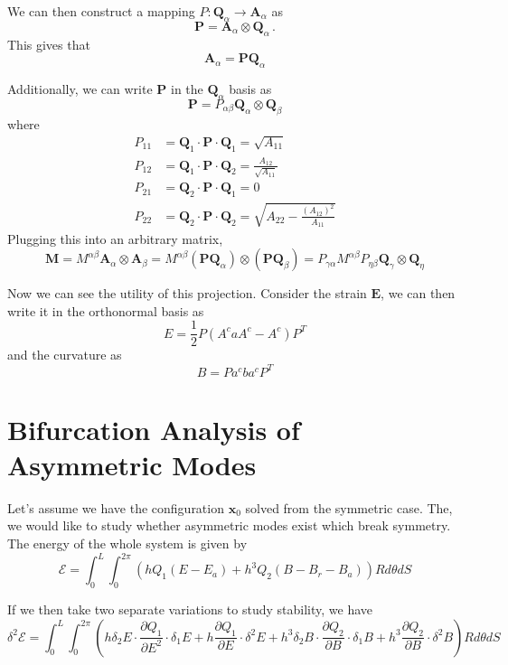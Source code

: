 \documentclass[11pt]{article}
\theoremstyle{plain}
\theoremstyle{definition}
\begin{document}
We can then construct a mapping $P : \mathbf{Q}_\alpha \to \mathbf{A}_\alpha$ as 
\[
\mathbf{P} = \mathbf{A}_\alpha \otimes \mathbf{Q}_{\alpha}\, .
\]
This gives that
\[
\mathbf{A}_\alpha = \mathbf{P}\mathbf{Q}_\alpha
\]

Additionally, we can write $\mathbf{P}$ in the $\mathbf{Q}_\alpha$ basis as
\[
\mathbf{P} = P_{\alpha \beta} \mathbf{Q}_\alpha \otimes \mathbf{Q}_\beta
\]
where
\[
\begin{split}
P_{11} &= \mathbf{Q}_1 \cdot \mathbf{P} \cdot \mathbf{Q}_1 = \sqrt{A_{11}} \\
P_{12} &= \mathbf{Q}_1 \cdot \mathbf{P} \cdot \mathbf{Q}_2 = \frac{A_{12}}{\sqrt{A_{11}}} \\
P_{21} &= \mathbf{Q}_2 \cdot \mathbf{P} \cdot \mathbf{Q}_1 = 0 \\
P_{22} &= \mathbf{Q}_2 \cdot \mathbf{P} \cdot \mathbf{Q}_2 = \sqrt{A_{22} - \frac{(A_{12})^2}{A_{11}}}
\end{split}
\]
Plugging this into an arbitrary matrix,
\[
\mathbf{M} = M^{\alpha \beta} \mathbf{A}_\alpha \otimes \mathbf{A}_\beta =  M^{\alpha \beta} \left( \mathbf{P} \mathbf{Q}_\alpha\right) \otimes \left( \mathbf{P} \mathbf{Q}_\beta \right) = P_{\gamma \alpha} M^{\alpha \beta} P_{\eta \beta} \mathbf{Q}_{\gamma} \otimes \mathbf{Q}_\eta
\]

Now we can see the utility of this projection. Consider the strain $\mathbf{E}$, we can then write it in the orthonormal basis as
\[
E = \frac{1}{2} P  \left( A^{c} a A^{c} - A^c \right)P^T
\]
and the curvature as
\[
B = P a^c b a^c P^T
\]


\section{Bifurcation Analysis of Asymmetric Modes}

Let's assume we have the configuration $\mathbf{x}_0$ solved from the symmetric case. The, we would like to study whether asymmetric modes exist which break symmetry. The energy of the whole system is given by
\[
\mathcal{E} = \int_0^L \int_0^{2\pi} \left( h Q_1 (E - E_a)  + h^3 Q_2 (B - B_r - B_a)\right) R d \theta dS 
\]

If we then take two separate variations to study stability, we have
\[
\delta^2 \mathcal{E} = \int_0^L \int_0^{2\pi} \left( h \delta_2 E \cdot \dfrac{\partial Q_1}{\partial E^2} \cdot \delta_1 E  + h \dfrac{\partial Q_1}{\partial E} \cdot \delta^2 E + h^3 \delta_2 B \cdot \dfrac{\partial Q_2}{\partial B} \cdot \delta_1 B + h^3\dfrac{\partial Q_2}{\partial B} \cdot \delta^2 B \right) R d\theta dS
\]
\end{document}

